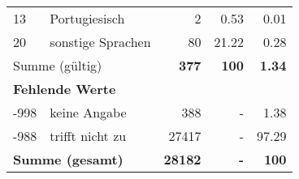 \begin{longtable}{lXrrr}
     13 &
     \multicolumn{1}{X}{ Portugiesisch   } &


       \num{2} &
       \num[round-mode=places,round-precision=2]{0,53} &
         \num[round-mode=places,round-precision=2]{0,01} \\

     20 &
     \multicolumn{1}{X}{ sonstige Sprachen   } &


       \num{80} &
       \num[round-mode=places,round-precision=2]{21,22} &
         \num[round-mode=places,round-precision=2]{0,28} \\
     \midrule
     \multicolumn{2}{l}{Summe (gültig)} &
       \textbf{\num{377}} &
     \textbf{100} &
       \textbf{\num[round-mode=places,round-precision=2]{1,34}} \\
     \multicolumn{5}{l}{\textbf{Fehlende Werte}}\\
       -998 &
       keine Angabe &
         \num{388} &
        - &
         \num[round-mode=places,round-precision=2]{1,38} \\
       -988 &
       trifft nicht zu &
         \num{27417} &
        - &
         \num[round-mode=places,round-precision=2]{97,29} \\
     \midrule
     \multicolumn{2}{l}{\textbf{Summe (gesamt)}} &
          \textbf{\num{28182}} &
        \textbf{-} &
        \textbf{100} \\
     \bottomrule
     \end{longtable}
     
